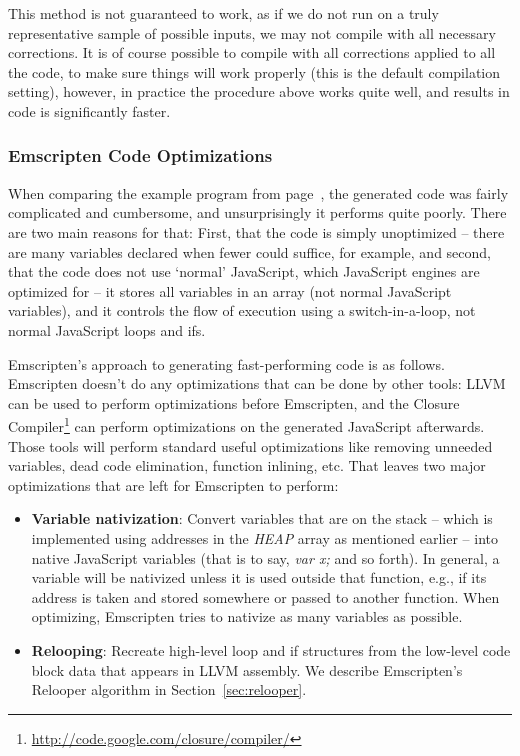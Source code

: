\documentclass[preprint,10pt]{sigplanconf}
\begin{document}
This method is not guaranteed to work, as if we do not run on a truly representative
sample of possible inputs, we may not compile with all necessary corrections. It is
of course possible to compile with all corrections applied to all the code, to make
sure things will work properly (this is the default compilation setting), however, in
practice the procedure above works quite well, and results in code is significantly faster.

\subsubsection{Emscripten Code Optimizations}
\label{sec:codeopt}

When comparing the example program from page~\pageref{code:example},
the generated code was fairly complicated
and cumbersome, and unsurprisingly it performs quite poorly. There
are two main reasons for that: First, that the code is simply
unoptimized -- there are many variables declared when fewer could
suffice, for example, and second, that the code does not use `normal'
JavaScript, which JavaScript engines are optimized for -- it
stores all variables in an array (not normal JavaScript variables),
and it controls the flow of execution using a switch-in-a-loop, not
normal JavaScript loops and ifs.

Emscripten's approach to generating fast-performing code is as
follows. Emscripten doesn't do any
optimizations that can be done by other tools:
LLVM can be used to perform optimizations before Emscripten, and
the Closure Compiler\footnote{\url{http://code.google.com/closure/compiler/}}
can perform optimizations on the generated JavaScript afterwards. Those
tools will perform standard useful optimizations like removing unneeded variables, dead code elimination,
function inlining, etc.
That leaves two major optimizations that are left for Emscripten
to perform:
\begin{itemize}
\item \textbf{Variable nativization}: Convert variables
      that are on the stack -- which is implemented using addresses in the \emph{HEAP} array
      as mentioned earlier -- into native JavaScript variables (that is to say, \emph{var x;} and so forth). In general,
      a variable will be nativized unless it is used
      outside that function, e.g., if its address is taken and stored somewhere
      or passed to another function. When optimizing, Emscripten tries to nativize
      as many variables as possible.
\item \textbf{Relooping}: Recreate high-level loop and if structures
      from the low-level code block data that appears in LLVM assembly.
      We describe Emscripten's Relooper algorithm in Section~\ref{sec:relooper}.
\end{itemize}
\end{document}
